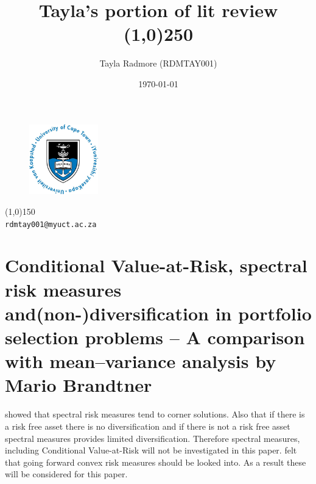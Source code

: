 \documentclass[12pt,a4paper]{article}
\begin{document}
\begin{titlepage}

\title{Tayla's portion of lit review\\
\line(1,0){250}\\}

\date{\today}

\author{Tayla Radmore (RDMTAY001)}

\maketitle

\begin{figure}

\begin{center}
\includegraphics[width=3cm]{UCTlogo.jpg}\\[1cm]
\end{center}

\end{figure}

\begin{center}
\line(1,0){150}\\
{{\tt rdmtay001@myuct.ac.za}}
\end{center}

\thispagestyle{empty}

\end{titlepage}


\tableofcontents

\newpage


\section{Conditional Value-at-Risk, spectral risk measures and(non-)diversification in portfolio selection problems – A comparison with mean–variance analysis by Mario Brandtner}
\label{sec:1}

\cite{BRANDTNER20135526} showed that spectral risk measures tend to corner solutions. Also that if there is a risk free asset there is no diversification and if there is not a risk free asset spectral measures provides limited diversification. Therefore spectral measures, including Conditional Value-at-Risk will not be investigated in this paper. \cite{BRANDTNER20135526} felt that going forward convex risk measures should be looked into. As a result these will be considered for this paper.
\end{document}
